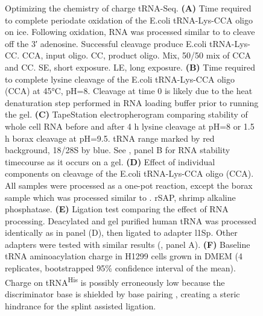 \documentclass[9pt,lineno]{elife}
\begin{document}
\begin{figure}[ht!]
\centering
{}
\caption{
Optimizing the chemistry of charge tRNA-Seq.
\textbf{(A)} Time required to complete periodate oxidation of the E.coli tRNA-Lys-CCA oligo on ice.
Following oxidation, RNA was processed similar to \cite{Evans2017-st} to cleave off the 3′ adenosine.
Successful cleavage produce E.coli tRNA-Lys-CC.
CCA, input oligo.
CC, product oligo.
Mix, 50/50 mix of CCA and CC.
SE, short exposure.
LE, long exposure.
\textbf{(B)} Time required to complete lysine cleavage of the E.coli tRNA-Lys-CCA oligo (CCA) at 45°C, pH=8.
Cleavage at time 0 is likely due to the heat denaturation step performed in RNA loading buffer prior to running the gel.
\textbf{(C)} TapeStation electropherogram comparing stability of whole cell RNA before and after 4 h lysine cleavage at pH=8 or 1.5 h borax cleavage at pH=9.5.
tRNA range marked by red background, 18/28S by blue.
See , panel B for RNA stability timecourse as it occurs on a gel.
\textbf{(D)} Effect of individual components on cleavage of the E.coli tRNA-Lys-CCA oligo (CCA).
All samples were processed as a one-pot reaction, except the borax sample which was processed similar to \cite{Evans2017-st}.
rSAP, shrimp alkaline phosphatase.
\textbf{(E)} Ligation test comparing the effect of RNA processing.
Deacylated and gel purified human tRNA was processed identically as in panel (D), then ligated to adapter l1Sp.
Other adapters were tested with similar results (, panel A).
\textbf{(F)} Baseline tRNA aminoacylation charge in H1299 cells grown in DMEM (4 replicates, bootstrapped 95\% confidence interval of the mean).
Charge on tRNA\textsuperscript{His} is possibly erroneously low because the discriminator base is shielded by base pairing \citep{Heinemann2012-hq}, creating a steric hindrance for the splint assisted ligation.
}
\label{fig:Fig2}


\end{figure}
\end{document}
